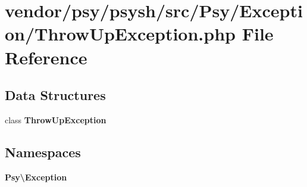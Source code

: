 \section{vendor/psy/psysh/src/\+Psy/\+Exception/\+Throw\+Up\+Exception.php File Reference}
\label{_throw_up_exception_8php}
\subsection*{Data Structures}
\begin{DoxyCompactItemize}
\item 
class {\bf Throw\+Up\+Exception}
\end{DoxyCompactItemize}
\subsection*{Namespaces}
\begin{DoxyCompactItemize}
\item 
 {\bf Psy\textbackslash{}\+Exception}
\end{DoxyCompactItemize}
